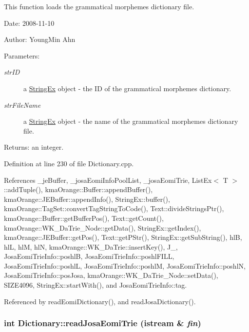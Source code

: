 This function loads the grammatical morphemes dictionary file. 

\begin{Desc}
\item[Date:]2008-11-10 \end{Desc}
\begin{Desc}
\item[Author:]YoungMin Ahn \end{Desc}
\begin{Desc}
\item[Parameters:]
\begin{description}
\item[{\em strID}]a \hyperlink{classStringEx}{StringEx} object - the ID of the grammatical morphemes dictionary. \item[{\em strFileName}]a \hyperlink{classStringEx}{StringEx} object - the name of the grammatical morphemes dictionary file. \end{description}
\end{Desc}
\begin{Desc}
\item[Returns:]an integer. \end{Desc}


Definition at line 230 of file Dictionary.cpp.

References \_\-jeBuffer, \_\-josaEomiInfoPoolList, \_\-josaEomiTrie, ListEx$<$ T $>$::addTuple(), kmaOrange::Buffer::appendBuffer(), kmaOrange::JEBuffer::appendInfo(), StringEx::buffer(), kmaOrange::TagSet::convertTagStringToCode(), Text::divideStringsPtr(), kmaOrange::Buffer::getBufferPos(), Text::getCount(), kmaOrange::WK\_\-DaTrie\_\-Node::getData(), StringEx::getIndex(), kmaOrange::JEBuffer::getPos(), Text::getPStr(), StringEx::getSubString(), hlB, hlL, hlM, hlN, kmaOrange::WK\_\-DaTrie::insertKey(), J\_\-, JosaEomiTrieInfo::poshlB, JosaEomiTrieInfo::poshlFILL, JosaEomiTrieInfo::poshlL, JosaEomiTrieInfo::poshlM, JosaEomiTrieInfo::poshlN, JosaEomiTrieInfo::posJosa, kmaOrange::WK\_\-DaTrie\_\-Node::setData(), SIZE4096, StringEx::startWith(), and JosaEomiTrieInfo::tag.

Referenced by readEomiDictionary(), and readJosaDictionary().\hypertarget{classkmaOrange_1_1Dictionary_2c33512975c472072bbf92eaac0d76f7}{
\subsubsection[{readJosaEomiTrie}]{\setlength{\rightskip}{0pt plus 5cm}int Dictionary::readJosaEomiTrie (istream \& {\em fin})}}
\label{classkmaOrange_1_1Dictionary_2c33512975c472072bbf92eaac0d76f7}


